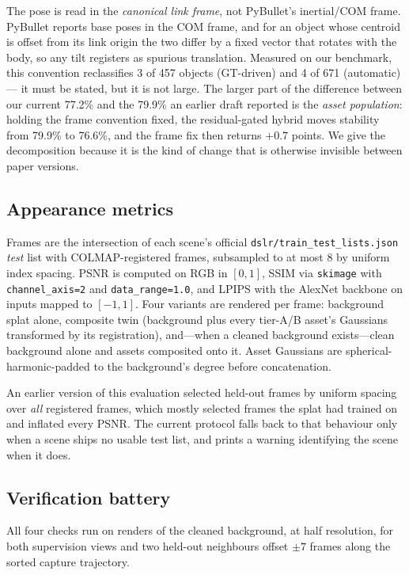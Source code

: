 The pose is read in the \emph{canonical link frame}, not PyBullet's
inertial/COM frame. PyBullet reports base poses in the COM frame, and for
an object whose centroid is offset from its link origin the two differ by
a fixed vector that rotates with the body, so any tilt registers as
spurious translation. Measured on our benchmark, this convention
reclassifies 3 of 457 objects (GT-driven) and 4 of 671 (automatic) --- it
must be stated, but it is not large. The larger part of the difference
between our current 77.2\% and the 79.9\% an earlier draft reported is the
\emph{asset population}: holding the frame convention fixed, the
residual-gated hybrid moves stability from 79.9\% to 76.6\%, and the
frame fix then returns $+0.7$ points. We give the decomposition because
it is the kind of change that is otherwise invisible between paper
versions.

\subsection{Appearance metrics}
Frames are the intersection of each scene's official
\texttt{dslr/train\_test\_lists.json} \emph{test} list with
COLMAP-registered frames, subsampled to at most 8 by uniform index
spacing. PSNR is computed on RGB in $[0,1]$, SSIM via \texttt{skimage}
with \texttt{channel\_axis=2} and \texttt{data\_range=1.0}, and LPIPS with
the AlexNet backbone on inputs mapped to $[-1,1]$. Four variants are
rendered per frame: background splat alone, composite twin (background
plus every tier-A/B asset's Gaussians transformed by its registration),
and---when a cleaned background exists---clean background alone and
assets composited onto it. Asset Gaussians are spherical-harmonic-padded
to the background's degree before concatenation.

An earlier version of this evaluation selected held-out frames by uniform
spacing over \emph{all} registered frames, which mostly selected frames
the splat had trained on and inflated every PSNR. The current protocol
falls back to that behaviour only when a scene ships no usable test list,
and prints a warning identifying the scene when it does.

\subsection{Verification battery}
All four checks run on renders of the cleaned background, at half
resolution, for both supervision views and two held-out neighbours offset
$\pm7$ frames along the sorted capture trajectory.

